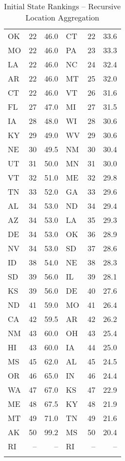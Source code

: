 \begin{longtable}{lrr||lrr}
        OK &   22 &  46.0 &             CT &   22 &  33.6 \\
        MO &   22 &  46.0 &             PA &   23 &  33.3 \\
        LA &   22 &  46.0 &             NC &   24 &  32.4 \\
        AR &   22 &  46.0 &             MT &   25 &  32.0 \\
        CT &   22 &  46.0 &             VT &   26 &  31.6 \\
        FL &   27 &  47.0 &             MI &   27 &  31.5 \\
        IA &   28 &  48.0 &             WI &   28 &  30.6 \\
        KY &   29 &  49.0 &             WV &   29 &  30.6 \\
        NE &   30 &  49.5 &             NM &   30 &  30.4 \\
        UT &   31 &  50.0 &             MN &   31 &  30.0 \\
        VT &   32 &  51.0 &             ME &   32 &  29.8 \\
        TN &   33 &  52.0 &             GA &   33 &  29.6 \\
        AL &   34 &  53.0 &             ND &   34 &  29.4 \\
        AZ &   34 &  53.0 &             LA &   35 &  29.3 \\
        DE &   34 &  53.0 &             OK &   36 &  28.9 \\
        NV &   34 &  53.0 &             SD &   37 &  28.6 \\
        ID &   38 &  54.0 &             NE &   38 &  28.3 \\
        SD &   39 &  56.0 &             IL &   39 &  28.1 \\
        KS &   39 &  56.0 &             DE &   40 &  27.6 \\
        ND &   41 &  59.0 &             MO &   41 &  26.4 \\
        CA &   42 &  59.5 &             AR &   42 &  26.2 \\
        NM &   43 &  60.0 &             OH &   43 &  25.4 \\
        HI &   43 &  60.0 &             IA &   44 &  25.0 \\
        MS &   45 &  62.0 &             AL &   45 &  24.5 \\
        OR &   46 &  65.0 &             IN &   46 &  24.4 \\
        WA &   47 &  67.0 &             KS &   47 &  22.9 \\
        ME &   48 &  67.5 &             KY &   48 &  21.9 \\
        MT &   49 &  71.0 &             TN &   49 &  21.6 \\
        AK &   50 &  99.2 &             MS &   50 &  20.4 \\
        RI &   -- &    -- &             RI &   -- &    -- \\
        \caption{Initial State Rankings -- Recursive Location Aggregation}
        \label{tab:dns_only_recursive_initial_state_rankings}
\end{longtable}
